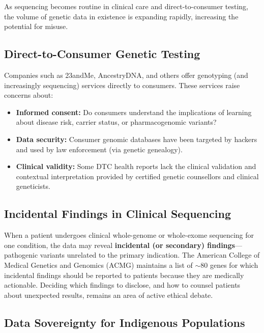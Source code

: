 As sequencing becomes routine in clinical care and direct-to-consumer testing, the volume of genetic data in existence is expanding rapidly, increasing the potential for misuse.

\subsection{Direct-to-Consumer Genetic Testing}
\label{subsec:emerging:dtc}

Companies such as 23andMe, AncestryDNA, and others offer genotyping (and increasingly sequencing) services directly to consumers. These services raise concerns about:

\begin{itemize}[itemsep=2pt]
  \item \textbf{Informed consent:} Do consumers understand the implications of learning about disease risk, carrier status, or pharmacogenomic variants?
  \item \textbf{Data security:} Consumer genomic databases have been targeted by hackers and used by law enforcement (via genetic genealogy).
  \item \textbf{Clinical validity:} Some DTC health reports lack the clinical validation and contextual interpretation provided by certified genetic counsellors and clinical geneticists.
\end{itemize}

\subsection{Incidental Findings in Clinical Sequencing}
\label{subsec:emerging:incidental}

When a patient undergoes clinical whole-genome or whole-exome sequencing for one condition, the data may reveal \textbf{incidental (or secondary) findings}---pathogenic variants unrelated to the primary indication. The American College of Medical Genetics and Genomics (ACMG) maintains a list of $\sim$80 genes for which incidental findings should be reported to patients because they are medically actionable. Deciding which findings to disclose, and how to counsel patients about unexpected results, remains an area of active ethical debate.

\subsection{Data Sovereignty for Indigenous Populations}
\label{subsec:emerging:data-sovereignty}

